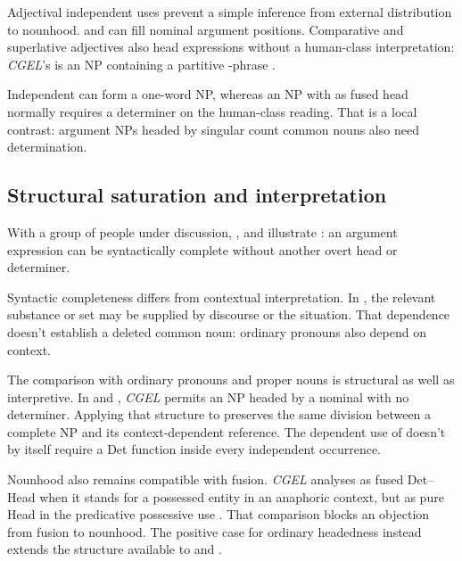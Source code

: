 \documentclass[12pt]{article}
\begin{document}
Adjectival independent uses prevent a simple inference from external distribution to nounhood.  and  can fill nominal argument positions. Comparative and superlative adjectives also head expressions without a human-class interpretation: \textit{CGEL}'s  is an NP containing a partitive -phrase \citep[332--333, 416--423]{huddleston2002}.

Independent  can form a one-word NP, whereas an NP with  as fused head normally requires a determiner on the human-class reading. That is a local contrast: argument NPs headed by singular count common nouns also need determination.

\subsection{Structural saturation and interpretation}

With a group of people under discussion, ,  and  illustrate : an argument expression can be syntactically complete without another overt head or determiner.

Syntactic completeness differs from contextual interpretation. In , the relevant substance or set may be supplied by discourse or the situation. That dependence doesn't establish a deleted common noun: ordinary pronouns also depend on context.

The comparison with ordinary pronouns and proper nouns is structural as well as interpretive. In  and , \textit{CGEL} permits an NP headed by a nominal with no determiner. Applying that structure to  preserves the same division between a complete NP and its context-dependent reference. The dependent use of  doesn't by itself require a Det function inside every independent occurrence.

Nounhood also remains compatible with fusion. \textit{CGEL} analyses  as fused Det--Head when it stands for a possessed entity in an anaphoric context, but as pure Head in the predicative possessive use  \citep[410--411]{huddleston2002}. That comparison blocks an objection from fusion to nounhood. The positive case for ordinary headedness instead extends the structure available to  and .
\end{document}
